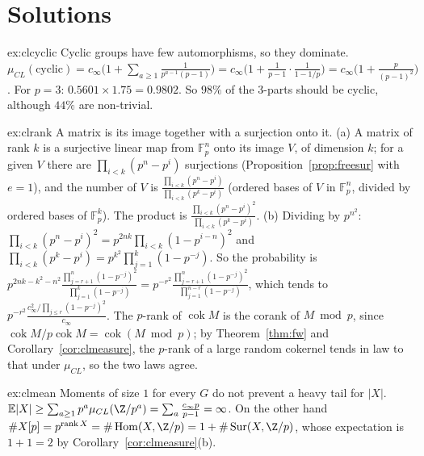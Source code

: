 \section{Solutions}

\begin{solution}{ex:clcyclic}
\idea Cyclic groups have few automorphisms, so they dominate.
\writeup $\mu_{CL}(\text{cyclic})=c_\infty\bigl(1+\sum_{a\ge1}\frac1{p^{a-1}(p-1)}\bigr)=c_\infty\bigl(1+\frac1{p-1}\cdot\frac1{1-1/p}\bigr)=c_\infty\bigl(1+\frac p{(p-1)^2}\bigr)$. For $p=3$: $0.5601\times1.75=0.9802$. So $98\%$ of the $3$-parts should be cyclic, although $44\%$ are non-trivial.
\end{solution}

\begin{solution}{ex:clrank}
\idea A matrix is its image together with a surjection onto it.
\writeup (a) A matrix of rank $k$ is a surjective linear map from $\mathbb F_p^n$ onto its image $V$, of dimension $k$; for a given $V$ there are $\prod_{i<k}(p^n-p^i)$ surjections (Proposition~\ref{prop:freesur} with $e=1$), and the number of $V$ is $\frac{\prod_{i<k}(p^n-p^i)}{\prod_{i<k}(p^k-p^i)}$ (ordered bases of $V$ in $\mathbb F_p^n$, divided by ordered bases of $\mathbb F_p^k$). The product is $\frac{\prod_{i<k}(p^n-p^i)^2}{\prod_{i<k}(p^k-p^i)}$. (b) Dividing by $p^{n^2}$: $\prod_{i<k}(p^n-p^i)^2=p^{2nk}\prod_{i<k}(1-p^{i-n})^2$ and $\prod_{i<k}(p^k-p^i)=p^{k^2}\prod_{j=1}^k(1-p^{-j})$. So the probability is $p^{2nk-k^2-n^2}\frac{\prod_{j=r+1}^n(1-p^{-j})^2}{\prod_{j=1}^k(1-p^{-j})}=p^{-r^2}\frac{\prod_{j=r+1}^n(1-p^{-j})^2}{\prod_{j=1}^{n-r}(1-p^{-j})}$, which tends to $p^{-r^2}\frac{c_\infty^2/\prod_{j\le r}(1-p^{-j})^2}{c_\infty}$. The $p$-rank of $\operatorname{cok}M$ is the corank of $M\bmod p$, since $\operatorname{cok}M/p\operatorname{cok}M=\operatorname{cok}(M\bmod p)$; by Theorem~\ref{thm:fw} and Corollary~\ref{cor:clmeasure}, the $p$-rank of a large random cokernel tends in law to that under $\mu_{CL}$, so the two laws agree.
\end{solution}

\begin{solution}{ex:clmean}
\idea Moments of size $1$ for every $G$ do not prevent a heavy tail for $|X|$.
\writeup $\mathbb E|X|\ge\sum_{a\ge1}p^a\mu_{CL}(\Z/p^a)=\sum_a\frac{c_\infty p}{p-1}=\infty$. On the other hand $\#X[p]=p^{\operatorname{rank}X}=\#\operatorname{Hom}(X,\Z/p)=1+\#\operatorname{Sur}(X,\Z/p)$, whose expectation is $1+1=2$ by Corollary~\ref{cor:clmeasure}(b).
\end{solution}

